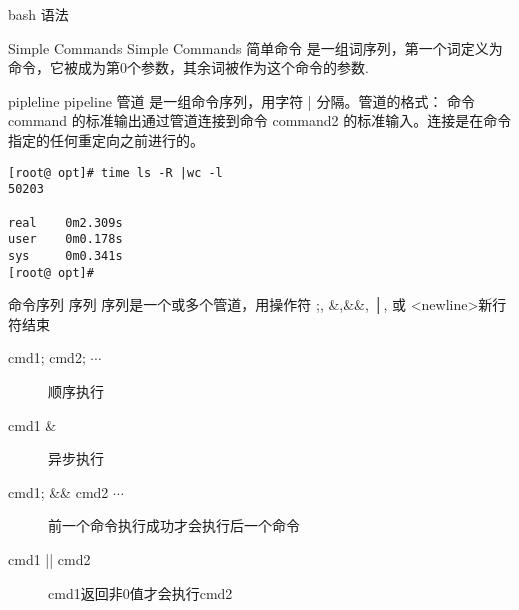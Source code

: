 \begin{frame}{bash 语法}
\begin{block}{Simple Commands}
\alert{Simple Commands 简单命令} 是一组词序列，第一个词定义为命令，它被成为第0个参数，其余词被作为这个命令的参数.
\end{block}

\newpage

\begin{block}{pipleline}
\alert{pipeline 管道} 是一组命令序列，用字符 | 分隔。管道的格式： 命令 command 的标准输出通过管道连接到命令 command2 的标准输入。连接是在命令指定的任何重定向之前进行的。

\begin{verbatim}
[root@ opt]# time ls -R |wc -l
50203

real    0m2.309s
user    0m0.178s
sys     0m0.341s
[root@ opt]#
\end{verbatim}
\end{block}

\begin{block}{命令序列}
\alert{序列} 序列是一个或多个管道，用操作符 ;, \&,\&\&, │, 或 <newline>新行符结束\begin{description}
\item[cmd1; cmd2; $\cdots$] 顺序执行
\item[cmd1 \&] 异步执行
\item[cmd1; \&\& cmd2 $\cdots$] 前一个命令执行成功才会执行后一个命令
\item[cmd1 || cmd2 ] cmd1返回非0值才会执行cmd2
\end{description}
\end{block}
\end{frame}


